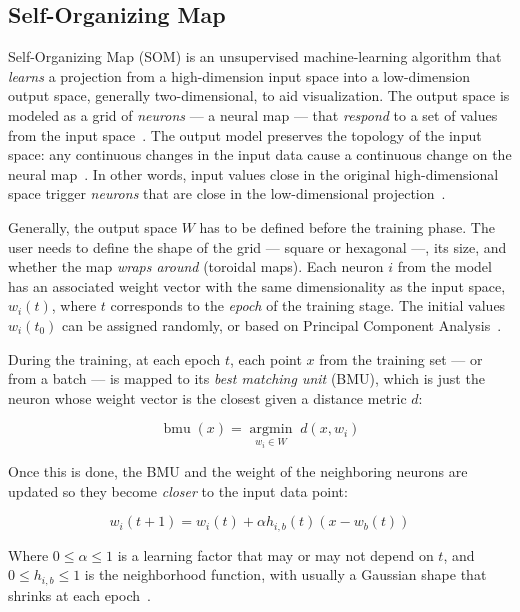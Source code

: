 \subsection{Self-Organizing Map}

Self-Organizing Map (SOM) is an unsupervised machine-learning algorithm that \emph{learns}
a projection from a high-dimension input space into a low-dimension output space,
generally two-dimensional, to aid visualization.
The output space is modeled as a grid of \emph{neurons} --- a neural map --- that
\emph{respond} to a set of values from the input space~\cite{kohonen1982self}.
The output model preserves the topology of the input space: any continuous changes in the
input data cause a continuous change on the neural map~\cite{Villmann1999}.
In other words, input values close in the original high-dimensional space
trigger \emph{neurons} that are close in the low-dimensional projection~\cite{KOHONEN201352}.

Generally, the output space $W$ has to be defined before the training phase. The user needs to
define the shape of the grid --- square or hexagonal ---, its size, and whether
the map \emph{wraps around} (toroidal maps).
Each neuron $i$ from the model has an associated weight vector with the same dimensionality
as the input space, $w_{i}(t)$, where $t$ corresponds to the \emph{epoch} of the training stage.
The initial values $w_i(t_0)$ can be assigned randomly, or based on
Principal Component Analysis~\cite{KOHONEN201352}.

During the training, at each epoch $t$, each point $x$ from the training set --- or from a batch ---
is mapped to its \emph{best matching unit} (BMU), which is just the neuron whose weight vector is
the closest given a distance metric $d$:

\begin{equation}
    \operatorname{bmu}(x) = \underset{w_i \in W}{\operatorname{argmin}} \; d(x, w_i)
\end{equation}

Once this is done, the BMU and the weight of the neighboring neurons are updated so they become
\emph{closer} to the input data point:

\begin{equation}
    w_i(t + 1) = w_i(t) + \alpha h_{i,b}(t) (x - w_b(t))
\end{equation}

Where $0 \le \alpha \le 1$ is a learning factor that may or may not depend on $t$,
and $0 \le h_{i,b} \le 1$ is the neighborhood function, with usually a Gaussian shape
that shrinks at each epoch~\cite{Villmann1999,wittek2013somoclu}.


